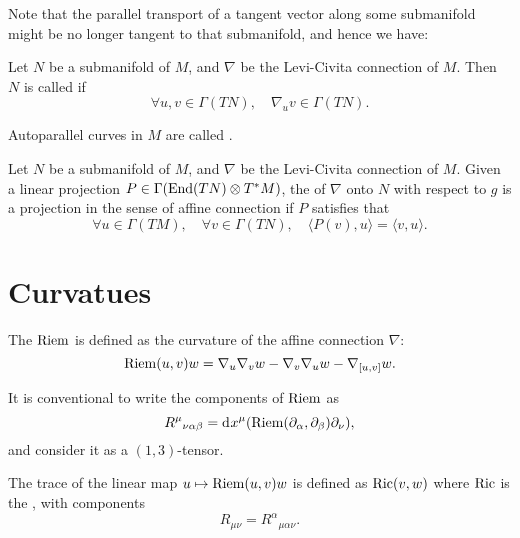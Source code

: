\documentclass[openany, oneside, a5paper]{book}
\begin{document}
Note that the parallel transport of a tangent vector along some submanifold might be no longer tangent to that submanifold, and hence we have:

\begin{definition}
    Let $N$ be a submanifold of $M$, and $\nabla$ be the Levi-Civita connection of $M$.
    Then $N$ is called  if
    \begin{equation}
        \forall u, v \in \Gamma(TN), \quad
        \nabla_u v \in \Gamma(TN).
    \end{equation}
\end{definition}


Autoparallel curves in $M$ are called .

\begin{definition}
    Let $N$ be a submanifold of $M$, and $\nabla$ be the Levi-Civita connection of $M$.
    Given a linear projection $P \in \Gamma(\operatorname{End}(TN) \otimes T^*M)$,
    the  of $\nabla$ onto $N$ with respect to $g$ is a projection in the sense of affine connection if $P$ satisfies that
    \begin{equation}
        \forall u \in \Gamma(TM), \quad
        \forall v \in \Gamma(TN), \quad
        \langle P(v), u \rangle = \langle v, u \rangle.
    \end{equation}
\end{definition}


\section{Curvatues}

The  $\operatorname{Riem}$ is defined as the curvature of the affine connection $\nabla$:
\begin{equation}
    \operatorname{Riem}(u, v) w = \nabla_u \nabla_v w - \nabla_v \nabla_u w - \nabla_{[u, v]} w.
\end{equation}

It is conventional to write the components of $\operatorname{Riem}$ as
\begin{equation}
    {R^\mu}_{\nu\alpha\beta} = \mathop{}\!\mathrm{d}^{} x^\mu (\operatorname{Riem}(\partial_\alpha, \partial_\beta) \partial_\nu), 
\end{equation}
and consider it as a $(1, 3)$-tensor.

The trace of the linear map $u \mapsto \operatorname{Riem}(u, v) w$ is defined as $\operatorname{Ric}(v, w)$ where $\operatorname{Ric}$ is the , with components
\begin{equation}
    R_{\mu\nu} = {R^\alpha}_{\mu\alpha\nu}.
\end{equation}
\end{document}
